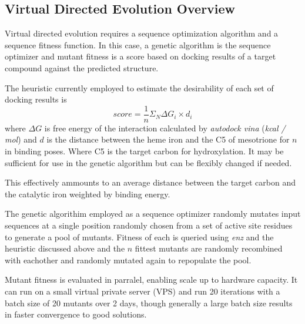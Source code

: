 \documentclass{article}
\begin{document}
\subsection{Virtual Directed Evolution Overview}
Virtual directed evolution requires a sequence optimization algorithm and a sequence fitness function. In this case, a genetic algorithm is the sequence optimizer and mutant fitness is a score based on docking results of a target compound against the predicted structure. %
\par
The heuristic currently employed to estimate the desirability of each set of docking results is %
\begin{equation}
score = \frac{1}{n}\Sigma _{N} \Delta G_{i} \times d_{i}
\end{equation}
where $ \Delta G $ is free energy of the interaction calculated by \textit{autodock vina} (\textit{kcal / mol}) and $ d $ is the distance between the heme iron and the C5 of mesotrione for $ n $ in binding poses. Where C5 is the target carbon for hydroxylation. It may be sufficient for use in the genetic algorithm but can be flexibly changed if needed. %
\par
This effectively ammounts to an average distance between the target carbon and the catalytic iron weighted by binding energy. %
\par
The genetic algorithim employed as a sequence optimizer randomly mutates input sequences at a single position randomly chosen from a set of active site residues to generate a pool of mutants. Fitness of each is queried using \textit{enz} and the heuristic discussed above and the $n$ fittest mutants are randomly recombined with eachother and randomly mutated again to repopulate the pool. %
\par
Mutant fitness is evaluated in parralel, enabling scale up to hardware capacity. It can run on a small virtual private server (VPS) and run 20 iterations with a batch size of 20 mutants over 2 days, though generally a large batch size results in faster convergence to good solutions. %
\end{document}
